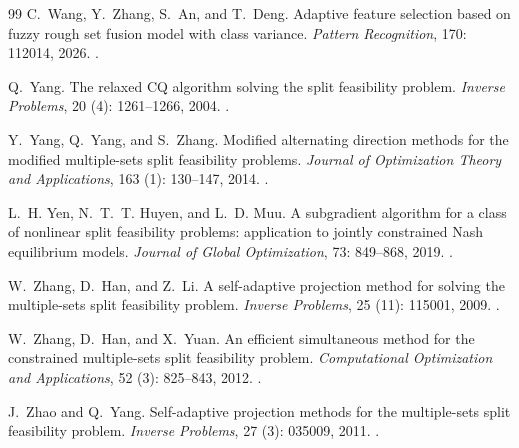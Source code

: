 \documentclass[]{interact}
\theoremstyle{plain}
\theoremstyle{definition}
\theoremstyle{remark}
\begin{document}
\begin{thebibliography}{99}
C.~Wang, Y.~Zhang, S.~An, and T.~Deng.
\newblock Adaptive feature selection based on fuzzy rough set fusion model with class variance.
\newblock \emph{Pattern Recognition}, 170: 112014, 2026.
\newblock {}.

Q.~Yang.
\newblock The relaxed {CQ} algorithm solving the split feasibility problem.
\newblock \emph{Inverse Problems}, 20 (4): 1261--1266, 2004.
\newblock {}.

Y.~Yang, Q.~Yang, and S.~Zhang.
\newblock Modified alternating direction methods for the modified multiple-sets split feasibility problems.
\newblock \emph{Journal of Optimization Theory and Applications}, 163 (1): 130--147, 2014.
\newblock {}.

L.~H. Yen, N.~T.~T. Huyen, and L.~D. Muu.
\newblock A subgradient algorithm for a class of nonlinear split feasibility problems: application to jointly constrained Nash equilibrium models.
\newblock \emph{Journal of Global Optimization}, 73: 849--868, 2019.
\newblock {}.

W.~Zhang, D.~Han, and Z.~Li.
\newblock A self-adaptive projection method for solving the multiple-sets split feasibility problem.
\newblock \emph{Inverse Problems}, 25 (11): 115001, 2009.
\newblock {}.

W.~Zhang, D.~Han, and X.~Yuan.
\newblock An efficient simultaneous method for the constrained multiple-sets split feasibility problem.
\newblock \emph{Computational Optimization and Applications}, 52 (3): 825--843, 2012.
\newblock {}.

J.~Zhao and Q.~Yang.
\newblock Self-adaptive projection methods for the multiple-sets split feasibility problem.
\newblock \emph{Inverse Problems}, 27 (3): 035009, 2011.
\newblock {}.

\end{thebibliography}
\end{document}
